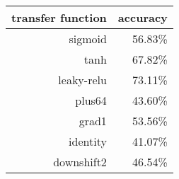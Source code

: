 \begin{tabular}{rr}
{\bf transfer function} & {\bf accuracy} \\
\hline 
sigmoid & 56.83\% \\
tanh & 67.82\% \\
leaky-relu & 73.11\% \\
plus64 & 43.60\% \\
grad1 & 53.56\% \\
identity & 41.07\% \\
downshift2 & 46.54\% \\
\end{tabular}
